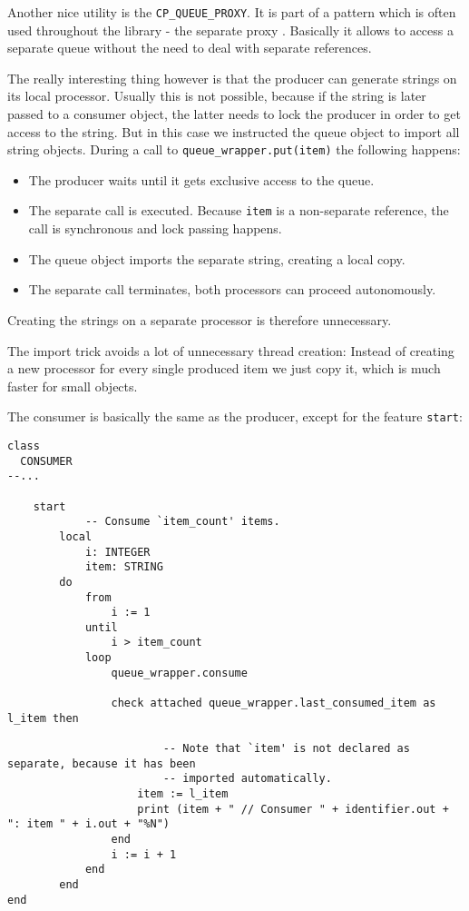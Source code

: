 \documentclass[a4paper,10pt]{report}
\begin{document}
Another nice utility is the \lstinline!CP_QUEUE_PROXY!.
It is part of a pattern which is often used throughout the library - the separate proxy .
Basically it allows to access a separate queue without the need to deal with separate references.

The really interesting thing however is that the producer can generate strings on its local processor.
Usually this is not possible, because if the string is later passed to a consumer object, the latter needs to lock the producer in order to get access to the string.
But in this case we instructed the queue object to import all string objects. During a call to \lstinline!queue_wrapper.put(item)! the following happens:
\begin{itemize}
 \item The producer waits until it gets exclusive access to the queue.
 \item The separate call is executed. Because \lstinline!item! is a non-separate reference, the call is synchronous and lock passing happens.
 \item The queue object imports the separate string, creating a local copy.
 \item The separate call terminates, both processors can proceed autonomously.
\end{itemize}
Creating the strings on a separate processor is therefore unnecessary.

The import trick avoids a lot of unnecessary thread creation:
Instead of creating a new processor for every single produced item we just copy it, which is much faster for small objects.

The consumer is basically the same as the producer, except for the feature \lstinline!start!:

\begin{lstlisting}
class
  CONSUMER
--...
  
	start
			-- Consume `item_count' items.
		local
			i: INTEGER
			item: STRING
		do
			from
				i := 1
			until
				i > item_count
			loop
				queue_wrapper.consume

				check attached queue_wrapper.last_consumed_item as l_item then

						-- Note that `item' is not declared as separate, because it has been
						-- imported automatically.
					item := l_item
					print (item + " // Consumer " + identifier.out + ": item " + i.out + "%N")
				end
				i := i + 1
			end
		end
end
\end{lstlisting}
\end{document}
